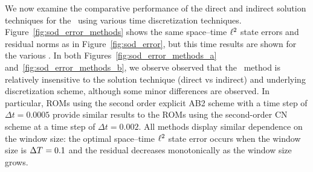 We now examine the comparative performance of the direct and indirect solution techniques for the \methodAcronymROMs\ using various time discretization techniques. 
Figure~\ref{fig:sod_error_methods} 
shows the same space--time $\ell^2$ state errors and residual norms as in Figure~\ref{fig:sod_error}, but this time results are shown for 
the various \methodAcronymROMs. In both Figures~\ref{fig:sod_error_methods_a} and~\ref{fig:sod_error_methods_b}, we observe observed that the \methodAcronym\ method 
is relatively insensitive to the solution technique (direct vs indirect) and underlying discretization scheme, although some minor differences are observed.
In particular, ROMs using the second order explicit AB2 scheme with a time step of $\Delta t = 0.0005$ provide similar results to the 
ROMs using the second-order CN scheme at a time step of $\Delta t = 0.002$. All methods display similar dependence on the window size: the optimal space--time
$\ell^2$ state error occurs when the window size is $\Delta T^{} = 0.1$ and the residual decreases monotonically as the window size grows. 
